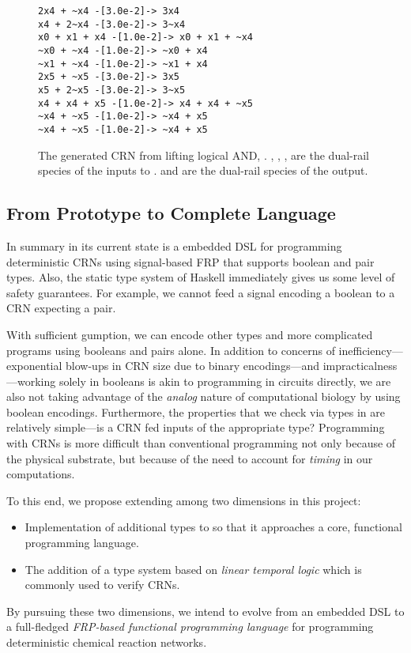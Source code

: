 \begin{figure}
\begin{center}
\begin{BVerbatim}
2x4 + ~x4 -[3.0e-2]-> 3x4
x4 + 2~x4 -[3.0e-2]-> 3~x4
x0 + x1 + x4 -[1.0e-2]-> x0 + x1 + ~x4
~x0 + ~x4 -[1.0e-2]-> ~x0 + x4
~x1 + ~x4 -[1.0e-2]-> ~x1 + x4
2x5 + ~x5 -[3.0e-2]-> 3x5
x5 + 2~x5 -[3.0e-2]-> 3~x5
x4 + x4 + x5 -[1.0e-2]-> x4 + x4 + ~x5
~x4 + ~x5 -[1.0e-2]-> ~x4 + x5
~x4 + ~x5 -[1.0e-2]-> ~x4 + x5
\end{BVerbatim}
\caption{The generated CRN from lifting logical AND, .
  , , ,  are the dual-rail species of the inputs to \hask{(&&)}.
   and  are the dual-rail species of the output.}
\label{fig:and-crn}
\end{center}
\end{figure}

\subsection{From Prototype to Complete Language}

In summary \reactamole{} in its current state is a embedded DSL for programming deterministic CRNs using signal-based FRP that supports boolean and pair types.
Also, the static type system of Haskell immediately gives us some level of safety guarantees.
For example, we cannot feed a signal encoding a boolean to a CRN expecting a pair.

With sufficient gumption, we can encode other types and more complicated programs using booleans and pairs alone.
In addition to concerns of inefficiency---exponential blow-ups in CRN size due to binary encodings---and impracticalness---working solely in booleans is akin to programming in circuits directly, we are also not taking advantage of the \emph{analog} nature of computational biology by using boolean encodings.
Furthermore, the properties that we check via types in \reactamole{} are relatively simple---is a CRN fed inputs of the appropriate type?
Programming with CRNs is more difficult than conventional programming not only because of the physical substrate, but because of the need to account for \emph{timing} in our computations.

To this end, we propose extending \reactamole{} among two dimensions in this project:
\begin{itemize}[itemsep=0pt]
  \item Implementation of additional types to \reactamole{} so that it approaches a core, functional programming language.
  \item The addition of a type system based on \emph{linear temporal logic} which is commonly used to verify CRNs.
\end{itemize}
By pursuing these two dimensions, we intend to evolve \reactamole from an embedded DSL to a full-fledged \emph{FRP-based functional programming language} for programming deterministic chemical reaction networks.

